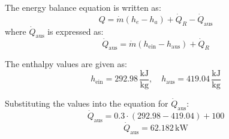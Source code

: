 The energy balance equation is written as:  
\[
Q = \dot{m} (h_e - h_a) + \dot{Q}_R - \dot{Q}_{\text{aus}}
\]  
where \( \dot{Q}_{\text{aus}} \) is expressed as:  
\[
\dot{Q}_{\text{aus}} = \dot{m} (h_{\text{ein}} - h_{\text{aus}}) + \dot{Q}_R
\]  

The enthalpy values are given as:  
\[
h_{\text{ein}} = 292.98 \, \frac{\text{kJ}}{\text{kg}}, \quad h_{\text{aus}} = 419.04 \, \frac{\text{kJ}}{\text{kg}}
\]  

Substituting the values into the equation for \( \dot{Q}_{\text{aus}} \):  
\[
\dot{Q}_{\text{aus}} = 0.3 \cdot (292.98 - 419.04) + 100
\]  
\[
\dot{Q}_{\text{aus}} = 62.182 \, \text{kW}
\]